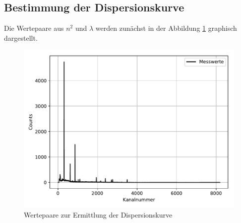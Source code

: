 \subsection{Bestimmung der Dispersionskurve}
Die Wertepaare aus $n^2$ und $\lambda$ werden zunächst in der Abbildung \ref{fig:plot1}
graphisch dargestellt.
\begin{figure}[H]
  \centering
  \includegraphics{plot1.pdf}
  \caption{Wertepaare zur Ermittlung der Dispersionskurve}
  \label{fig:plot1}
\end{figure}

